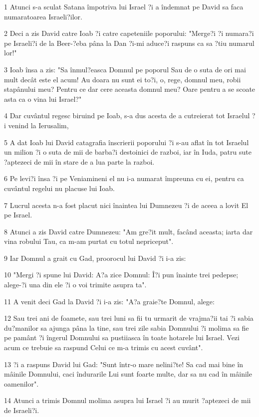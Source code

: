 \par 1 Atunci s-a sculat Satana împotriva lui Israel ?i a îndemnat pe David sa faca numaratoarea Israeli?ilor.
\par 2 Deci a zis David catre Ioab ?i catre capeteniile poporului: "Merge?i ?i numara?i pe Israeli?i de la Beer-?eba pâna la Dan ?i-mi aduce?i raspuns ca sa ?tiu numarul lor!"
\par 3 Ioab însa a zis: "Sa înmul?easca Domnul pe poporul Sau de o suta de ori mai mult decât este el acum! Au doara nu sunt ei to?i, o, rege, domnul meu, robii stapânului meu? Pentru ce dar cere aceasta domnul meu? Oare pentru a se scoate asta ca o vina lui Israel?"
\par 4 Dar cuvântul regesc biruind pe Ioab, s-a dus acesta de a cutreierat tot Israelul ?i venind la Ierusalim,
\par 5 A dat Ioab lui David catagrafia înscrierii poporului ?i s-au aflat în tot Israelul un milion ?i o suta de mii de barba?i destoinici de razboi, iar în Iuda, patru sute ?aptezeci de mii în stare de a lua parte la razboi.
\par 6 Pe levi?i însa ?i pe Veniamineni el nu i-a numarat împreuna cu ei, pentru ca cuvântul regelui nu placuse lui Ioab.
\par 7 Lucrul acesta n-a fost placut nici înaintea lui Dumnezeu ?i de aceea a lovit El pe Israel.
\par 8 Atunci a zis David catre Dumnezeu: "Am gre?it mult, facând aceasta; iarta dar vina robului Tau, ca m-am purtat cu totul nepriceput".
\par 9 Iar Domnul a grait cu Gad, proorocul lui David ?i i-a zis:
\par 10 "Mergi ?i spune lui David: A?a zice Domnul: Î?i pun înainte trei pedepse; alege-?i una din ele ?i o voi trimite asupra ta".
\par 11 A venit deci Gad la David ?i i-a zis: "A?a graie?te Domnul, alege:
\par 12 Sau trei ani de foamete, sau trei luni sa fii tu urmarit de vrajma?ii tai ?i sabia du?manilor sa ajunga pâna la tine, sau trei zile sabia Domnului ?i molima sa fie pe pamânt ?i îngerul Domnului sa pustiiasca în toate hotarele lui Israel. Vezi acum ce trebuie sa raspund Celui ce m-a trimis cu acest cuvânt".
\par 13 ?i a raspuns David lui Gad: "Sunt într-o mare nelini?te! Sa cad mai bine în mâinile Domnului, caci îndurarile Lui sunt foarte multe, dar sa nu cad în mâinile oamenilor".
\par 14 Atunci a trimis Domnul molima asupra lui Israel ?i au murit ?aptezeci de mii de Israeli?i.
